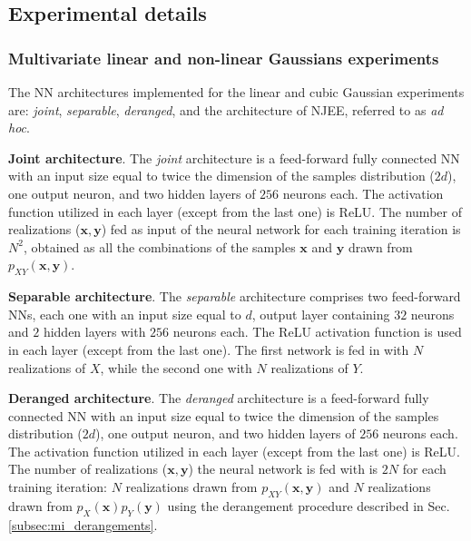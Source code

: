 \subsection{Experimental details}
\label{subsec:mi_appendix_experiment_details}

\subsubsection{Multivariate linear and non-linear Gaussians experiments}
\label{subsec:mi_appendix_staircases}

The NN architectures implemented for the linear and cubic Gaussian experiments are: \textit{joint}, \textit{separable}, \textit{deranged}, and the architecture of NJEE, referred to as \textit{ad hoc}. 

\textbf{Joint architecture}. The \textit{joint} architecture is a feed-forward fully connected NN with an input size equal to twice the dimension of the samples distribution ($2d$), one output neuron, and two hidden layers of $256$ neurons each. The activation function utilized in each layer (except from the last one) is ReLU.
The number of realizations ($\mathbf{x},\mathbf{y}$) fed as input of the neural network for each training iteration is $N^2$, obtained as all the combinations of the samples $\mathbf{x}$ and $\mathbf{y}$ drawn from $p_{XY}(\mathbf{x}, \mathbf{y})$. 

\textbf{Separable architecture}. The \textit{separable} architecture comprises two feed-forward NNs, each one with an input size equal to $d$, output layer containing $32$ neurons and $2$ hidden layers with $256$ neurons each. The ReLU activation function is used in each layer (except from the last one).
The first network is fed in with $N$ realizations of $X$, while the second one with $N$ realizations of $Y$.

\textbf{Deranged architecture}. The \textit{deranged} architecture is a feed-forward fully connected NN with an input size equal to twice the dimension of the samples distribution ($2d$), one output neuron, and two hidden layers of $256$ neurons each. The activation function utilized in each layer (except from the last one) is ReLU. 
The number of realizations ($\mathbf{x},\mathbf{y}$) the neural network is fed with is $2N$ for each training iteration: $N$ realizations drawn from $p_{XY}(\mathbf{x}, \mathbf{y})$ and $N$ realizations drawn from $p_X(\mathbf{x})p_Y(\mathbf{y})$ using the derangement procedure described in Sec. \ref{subsec:mi_derangements}.

